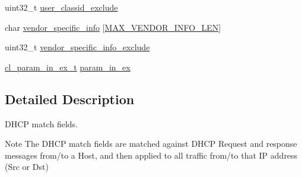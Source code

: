 \begin{DoxyCompactItemize}
\item 
uint32\-\_\-t \hyperlink{structcl__dhcp__match__t_a4a9acef87783b241f88bfb9406401b51}{user\-\_\-classid\-\_\-exclude}
\item 
char \hyperlink{structcl__dhcp__match__t_a2fcd52a023b1b4afee4ffbf806a361a5}{vendor\-\_\-specific\-\_\-info} \mbox{[}\hyperlink{group__FAPI__QOS__CLASS_ga490480957ae3800d1b1af04261aea96f}{M\-A\-X\-\_\-\-V\-E\-N\-D\-O\-R\-\_\-\-I\-N\-F\-O\-\_\-\-L\-E\-N}\mbox{]}
\item 
uint32\-\_\-t \hyperlink{structcl__dhcp__match__t_a7bf3b9316d154585b7748ac9502c52e2}{vendor\-\_\-specific\-\_\-info\-\_\-exclude}
\item 
\hyperlink{structcl__param__in__ex__t}{cl\-\_\-param\-\_\-in\-\_\-ex\-\_\-t} \hyperlink{structcl__dhcp__match__t_a1b012eaaabefd67b6a9b251270b48666}{param\-\_\-in\-\_\-ex}
\end{DoxyCompactItemize}


\subsection{Detailed Description}
D\-H\-C\-P match fields. 

\begin{DoxyNote}{Note}
The D\-H\-C\-P match fields are matched against D\-H\-C\-P Request and response messages from/to a Host, and then applied to all traffic from/to that I\-P address (Src or Dst) 
\end{DoxyNote}


